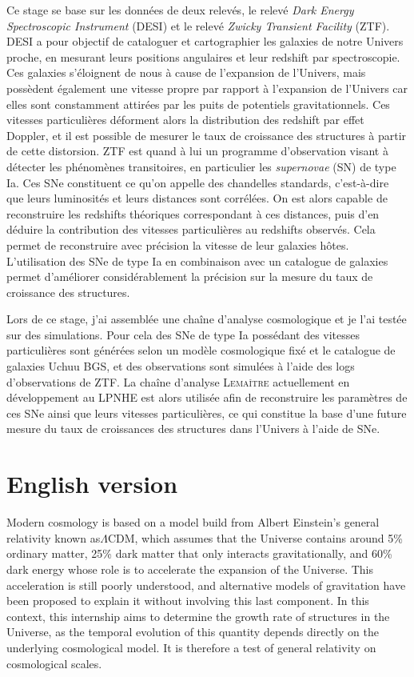 \documentclass{book}
\def\lemaitre{\textsc{Lemaître}\xspace}
\begin{document}
Ce stage se base sur les données de deux relevés, le relevé \textit{Dark Energy Spectroscopic Instrument} (DESI) et le relevé \textit{Zwicky Transient Facility} (ZTF). DESI a pour objectif de cataloguer et cartographier les galaxies de notre Univers proche, en mesurant leurs positions angulaires et leur redshift par spectroscopie. Ces galaxies s'éloignent de nous à cause de l'expansion de l'Univers, mais possèdent également une vitesse propre par rapport à l'expansion de l'Univers car elles sont constamment attirées par les puits de potentiels gravitationnels. Ces vitesses particulières déforment alors la distribution des redshift par effet Doppler, et il est possible de mesurer le taux de croissance des structures à partir de cette distorsion. ZTF est quand à lui un programme d'observation visant à détecter les phénomènes transitoires, en particulier les \textit{supernovae} (SN) de type Ia. Ces SNe constituent ce qu'on appelle des chandelles standards, c'est-à-dire que leurs luminosités et leurs distances sont corrélées. On est alors capable de reconstruire les redshifts théoriques correspondant à ces distances, puis d'en déduire la contribution des vitesses particulières au redshifts observés. Cela permet de reconstruire avec précision la vitesse de leur galaxies hôtes. L'utilisation des SNe de type Ia en combinaison avec un catalogue de galaxies permet d'améliorer considérablement la précision sur la mesure du taux de croissance des structures.

Lors de ce stage, j'ai assemblée une chaîne d'analyse cosmologique et je l'ai testée sur des simulations. Pour cela des SNe de type Ia possédant des vitesses particulières sont générées selon un modèle cosmologique fixé et le catalogue de galaxies Uchuu BGS, et des observations sont simulées à l'aide des logs d'observations de ZTF. La chaîne d'analyse \lemaitre actuellement en développement au LPNHE est alors utilisée afin de reconstruire les paramètres de ces SNe ainsi que leurs vitesses particulières, ce qui constitue la base d'une future mesure du taux de croissances des structures dans l'Univers à l'aide de SNe.

\clearpage
\section*{English version}
Modern cosmology is based on a model build from Albert Einstein's general relativity known as$\Lambda$CDM, which assumes that the Universe contains around 5\% ordinary matter, 25\% dark matter that only interacts gravitationally, and 60\% dark energy whose role is to accelerate the expansion of the Universe. This acceleration is still poorly understood, and alternative models of gravitation have been proposed to explain it without involving this last component. In this context, this internship aims to determine the growth rate of structures in the Universe, as the temporal evolution of this quantity depends directly on the underlying cosmological model. It is therefore a test of general relativity on cosmological scales.
\end{document}
